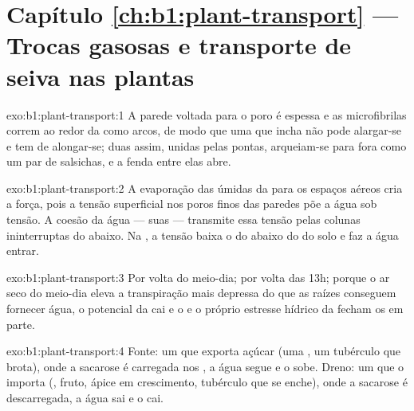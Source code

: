 \section*{Capítulo \ref{ch:b1:plant-transport} --- Trocas gasosas e transporte de seiva nas plantas}

\begin{solution}{exo:b1:plant-transport:1}
A parede voltada para o poro é espessa e as microfibrilas correm ao
redor da  como arcos, de modo que uma  que incha não pode
alargar-se e tem de alongar-se; duas  assim, unidas pelas
pontas, arqueiam-se para fora como um par de salsichas, e a fenda
entre elas abre.
\end{solution}

\begin{solution}{exo:b1:plant-transport:2}
A evaporação das  úmidas da  para os espaços
aéreos cria a força, pois a tensão superficial nos poros finos das
paredes põe a água sob tensão. A coesão da água --- suas  --- transmite essa tensão pelas colunas ininterruptas do
 abaixo. Na , a tensão baixa o  do 
abaixo do do solo e faz a água entrar.
\end{solution}

\begin{solution}{exo:b1:plant-transport:3}
Por volta do meio-dia; por volta das 13h; porque o ar seco do meio-dia
eleva a transpiração mais depressa do que as raízes conseguem fornecer
água, o potencial da  cai e o  e o próprio
estresse hídrico da  fecham os  em parte.
\end{solution}

\begin{solution}{exo:b1:plant-transport:4}
Fonte: um  que exporta açúcar (uma , um tubérculo que
brota), onde a sacarose é carregada nos , a água segue e
o  sobe. Dreno: um  que o importa (, fruto, ápice
em crescimento, tubérculo que se enche), onde a sacarose é
descarregada, a água sai e o  cai.
\end{solution}

